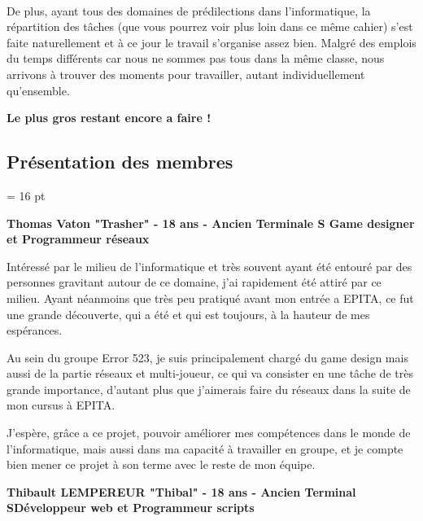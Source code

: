 \documentclass[12pt,a4paper]{article}
\begin{document}
\paragraph{}
De plus, ayant tous des domaines de prédilections dans l'informatique, la répartition des tâches (que vous pourrez voir plus loin dans ce même cahier) s'est faite naturellement et à ce jour le travail s'organise assez bien. Malgré des emplois du temps différents car nous ne sommes pas tous dans la même classe, nous arrivons à trouver des moments pour travailler, autant individuellement qu'ensemble.
\begin{center}
\textbf{Le plus gros restant encore a faire !}
\end{center}
\newpage
\subsection{Présentation des membres}
\baselineskip = 16 pt
\begin{center}
\textbf{Thomas Vaton "Trasher" - 18 ans - Ancien Terminale S\newline
Game designer et Programmeur réseaux}
\end{center}

Intéressé par le milieu de l'informatique et très souvent ayant été entouré par des personnes gravitant autour de ce domaine, j'ai rapidement été attiré par ce milieu. Ayant néanmoins que très peu pratiqué avant mon entrée a EPITA, ce fut une grande découverte, qui a été et qui est toujours, à la hauteur de mes espérances.

Au sein du groupe Error 523, je suis principalement chargé du game design mais aussi de la partie réseaux et multi-joueur, ce qui va consister en une tâche de très grande importance, d'autant plus que j'aimerais faire du réseaux dans la suite de mon cursus à EPITA.
   
J'espère, grâce a ce projet, pouvoir améliorer mes compétences dans le monde de l'informatique, mais aussi dans ma capacité à travailler en groupe, et je compte bien mener ce projet à son terme avec le reste de mon équipe.

\begin{center}
\textbf{Thibault LEMPEREUR "Thibal" - 18 ans - Ancien Terminal S\newline Développeur web et Programmeur scripts}

\end{center}
\end{document}
